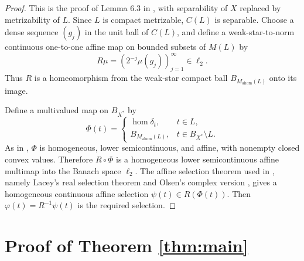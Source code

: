 \documentclass[11pt]{article}
\newcommand{\BX}{B_{X^*}}
\newcommand{\ahom}{\operatorname{ahom}}
\newcommand{\homop}{\operatorname{hom}}
\begin{document}
\begin{proof}
This is the proof of Lemma 6.3 in \cite{ondrej-spurny}, with separability of \(X\) replaced by metrizability of \(L\).  Since \(L\) is compact metrizable, \(C(L)\) is separable.  Choose a dense sequence \((g_j)\) in the unit ball of \(C(L)\), and define a weak-star-to-norm continuous one-to-one affine map on bounded subsets of \(M(L)\) by
\[
  R\mu=(2^{-j}\mu(g_j))_{j=1}^{\infty}\in \ell_2 .
\]
Thus \(R\) is a homeomorphism from the weak-star compact ball \(B_{M_{\ahom}(L)}\) onto its image.

Define a multivalued map on \(\BX\) by
\[
  \Phi(t)=
  \begin{cases}
    \homop\delta_t, & t\in L,\\
    B_{M_{\ahom}(L)}, & t\in \BX\setminus L .
  \end{cases}
\]
As in \cite[Lemma 6.3]{ondrej-spurny}, \(\Phi\) is homogeneous, lower semicontinuous, and affine, with nonempty closed convex values.  Therefore \(R\circ\Phi\) is a homogeneous lower semicontinuous affine multimap into the Banach space \(\ell_2\).  The affine selection theorem used in \cite[Lemma 6.3]{ondrej-spurny}, namely Lacey's real selection theorem and Olsen's complex version \cite{lacey,olsen}, gives a homogeneous continuous affine selection \(\psi(t)\in R(\Phi(t))\).  Then \(\varphi(t)=R^{-1}\psi(t)\) is the required selection.
\end{proof}

\section*{Proof of Theorem \ref{thm:main}}
\end{document}

